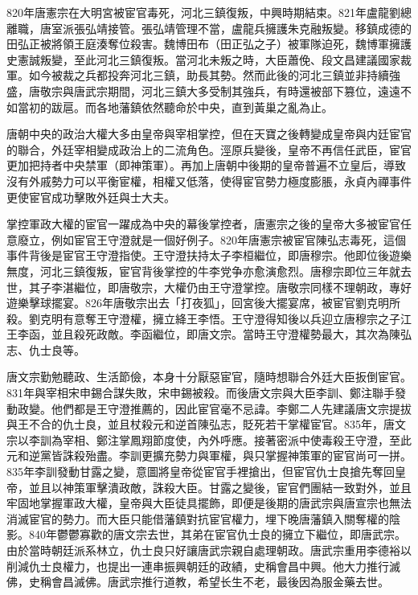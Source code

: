 820年唐憲宗在大明宮被宦官毒死，河北三鎮復叛，中興時期結束。821年盧龍劉總離職，唐室派張弘靖接管。張弘靖管理不當，盧龍兵擁護朱克融叛變。移鎮成德的田弘正被將領王庭湊奪位殺害。魏博田布（田正弘之子）被軍隊迫死，魏博軍擁護史憲誠叛變，至此河北三鎮復叛。當河北未叛之時，大臣蕭俛、段文昌建議國家裁軍。如今被裁之兵都投奔河北三鎮，助長其勢。然而此後的河北三鎮並非持續強盛，唐敬宗與唐武宗期間，河北三鎮大多受制其強兵，有時還被部下篡位，遠遠不如當初的跋扈。而各地藩鎮依然聽命於中央，直到黃巢之亂為止。

唐朝中央的政治大權大多由皇帝與宰相掌控，但在天寶之後轉變成皇帝與内廷宦官的聯合，外廷宰相變成政治上的二流角色。涇原兵變後，皇帝不再信任武臣，宦官更加把持者中央禁軍（即神策軍）。再加上唐朝中後期的皇帝普遍不立皇后，導致沒有外戚勢力可以平衡宦權，相權又低落，使得宦官勢力極度膨脹，永貞內禪事件更使宦官成功擊敗外廷與士大夫。

掌控軍政大權的宦官一躍成為中央的幕後掌控者，唐憲宗之後的皇帝大多被宦官任意廢立，例如宦官王守澄就是一個好例子。820年唐憲宗被宦官陳弘志毒死，這個事件背後是宦官王守澄指使。王守澄扶持太子李桓繼位，即唐穆宗。他即位後遊樂無度，河北三鎮復叛，宦官背後掌控的牛李党争亦愈演愈烈。唐穆宗即位三年就去世，其子李湛繼位，即唐敬宗，大權仍由王守澄掌控。唐敬宗同樣不理朝政，專好遊樂擊球擺宴。826年唐敬宗出去「打夜狐」，回宮後大擺宴席，被宦官劉克明所殺。劉克明有意奪王守澄權，擁立絳王李悟。王守澄得知後以兵迎立唐穆宗之子江王李函，並且殺死政敵。李函繼位，即唐文宗。當時王守澄權勢最大，其次為陳弘志、仇士良等。

唐文宗勤勉聽政、生活節儉，本身十分厭惡宦官，隨時想聯合外廷大臣扳倒宦官。831年與宰相宋申錫合謀失敗，宋申錫被殺。而後唐文宗與大臣李訓、鄭注聯手發動政變。他們都是王守澄推薦的，因此宦官毫不忌諱。李鄭二人先建議唐文宗提拔與王不合的仇士良，並且杖殺元和逆首陳弘志，貶死若干掌權宦官。835年，唐文宗以李訓為宰相、鄭注掌鳳翔節度使，內外呼應。接著密派中使毒殺王守澄，至此元和逆黨皆誅殺殆盡。李訓更擴充勢力與軍權，與只掌握神策軍的宦官尚可一拼。835年李訓發動甘露之變，意圖將皇帝從宦官手裡搶出，但宦官仇士良搶先奪回皇帝，並且以神策軍擊潰政敵，誅殺大臣。甘露之變後，宦官們團結一致對外，並且牢固地掌握軍政大權，皇帝與大臣徒具擺飾，即便是後期的唐武宗與唐宣宗也無法消滅宦官的勢力。而大臣只能借藩鎮對抗宦官權力，埋下晚唐藩鎮入關奪權的陰影。840年鬱鬱寡歡的唐文宗去世，其弟在宦官仇士良的擁立下繼位，即唐武宗。由於當時朝廷派系林立，仇士良只好讓唐武宗親自處理朝政。唐武宗重用李德裕以削減仇士良權力，也提出一連串振興朝廷的政績，史稱會昌中興。他大力推行滅佛，史稱會昌滅佛。唐武宗推行道教，希望长生不老，最後因為服金藥去世。

